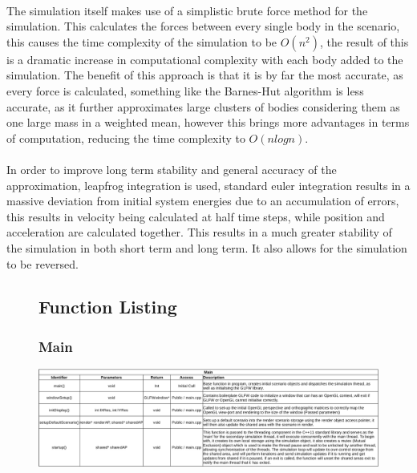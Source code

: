 \paragraph{}
The simulation itself makes use of a simplistic brute force method for the simulation. This calculates the forces between every single body in the scenario, this causes the time complexity of the simulation to be $O(n^2)$, the result of this is a dramatic increase in computational complexity with each body added to the simulation. The benefit of this approach is that it is by far the most accurate, as every force is calculated, something like the Barnes-Hut algorithm is less accurate, as it further approximates large clusters of bodies considering them as one large mass in a weighted mean, however this brings more advantages in terms of computation, reducing the time complexity to $O(nlogn)$.

\paragraph{}
In order to improve long term stability and general accuracy of the approximation, leapfrog integration is used, standard euler integration results in a massive deviation from initial system energies due to an accumulation of errors, this results in velocity being calculated at half time steps, while position and acceleration are calculated together. This results in a much greater stability of the simulation in both short term and long term. It also allows for the simulation to be reversed.

\begin{figure}
\subsection{Function Listing}
  \subsubsection{Main}
  \centering  
  \includegraphics[width=\textwidth]{img/functions/main.png}
\end{figure}

